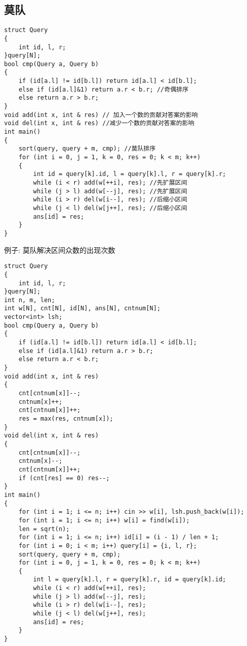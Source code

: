\documentclass[a4paper,fontset=none]{ctexart}
\begin{document}
\subsection{莫队}
\begin{verbatim}
struct Query
{
    int id, l, r;
}query[N];
bool cmp(Query a, Query b)
{
    if (id[a.l] != id[b.l]) return id[a.l] < id[b.l];
    else if (id[a.l]&1) return a.r < b.r; //奇偶排序
    else return a.r > b.r;
}
void add(int x, int & res) // 加入一个数的贡献对答案的影响
void del(int x, int & res) //减少一个数的贡献对答案的影响
int main()
{
    sort(query, query + m, cmp); //莫队排序
    for (int i = 0, j = 1, k = 0, res = 0; k < m; k++)
    {
        int id = query[k].id, l = query[k].l, r = query[k].r;
        while (i < r) add(w[++i], res); //先扩展区间
        while (j > l) add(w[--j], res); //先扩展区间
        while (i > r) del(w[i--], res); //后缩小区间
        while (j < l) del(w[j++], res); //后缩小区间
        ans[id] = res;
    }
}
\end{verbatim}
例子: 莫队解决区间众数的出现次数
\begin{verbatim}
struct Query
{
    int id, l, r;
}query[N];
int n, m, len;
int w[N], cnt[N], id[N], ans[N], cntnum[N];
vector<int> lsh;
bool cmp(Query a, Query b)
{
    if (id[a.l] != id[b.l]) return id[a.l] < id[b.l];
    else if (id[a.l]&1) return a.r > b.r;
    else return a.r < b.r;
}
void add(int x, int & res)
{
    cnt[cntnum[x]]--;
    cntnum[x]++;
    cnt[cntnum[x]]++;
    res = max(res, cntnum[x]);
}
void del(int x, int & res)
{
    cnt[cntnum[x]]--;
    cntnum[x]--;
    cnt[cntnum[x]]++;
    if (cnt[res] == 0) res--;
}
int main()
{
    for (int i = 1; i <= n; i++) cin >> w[i], lsh.push_back(w[i]);
    for (int i = 1; i <= n; i++) w[i] = find(w[i]);
    len = sqrt(n);
    for (int i = 1; i <= n; i++) id[i] = (i - 1) / len + 1;
    for (int i = 0; i < m; i++) query[i] = {i, l, r};
    sort(query, query + m, cmp);
    for (int i = 0, j = 1, k = 0, res = 0; k < m; k++)
    {
        int l = query[k].l, r = query[k].r, id = query[k].id;
        while (i < r) add(w[++i], res);
        while (j > l) add(w[--j], res);
        while (i > r) del(w[i--], res);
        while (j < l) del(w[j++], res);
        ans[id] = res;
    }
}
\end{verbatim}
\end{document}
